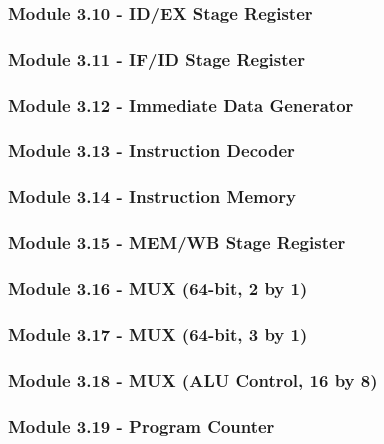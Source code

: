 \documentclass[12pt]{article}
\begin{document}
\subsubsection*{\large Module 3.10 - ID/EX Stage Register}

\subsubsection*{\large Module 3.11 - IF/ID Stage Register}

\subsubsection*{\large Module 3.12 - Immediate Data Generator}

\subsubsection*{\large Module 3.13 - Instruction Decoder}

\subsubsection*{\large Module 3.14 - Instruction Memory}

\subsubsection*{\large Module 3.15 - MEM/WB Stage Register}

\subsubsection*{\large Module 3.16 - MUX (64-bit, 2 by 1)}

\subsubsection*{\large Module 3.17 - MUX (64-bit, 3 by 1)}

\subsubsection*{\large Module 3.18 - MUX (ALU Control, 16 by 8)}

\subsubsection*{\large Module 3.19 - Program Counter}

\end{document}
